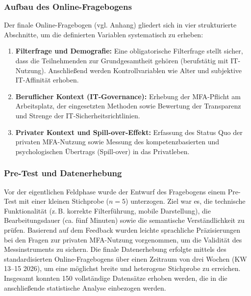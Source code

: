 \subsubsection{Aufbau des Online-Fragebogens}
Der finale Online-Fragebogen (vgl. Anhang) gliedert sich in vier strukturierte Abschnitte, um die definierten Variablen systematisch zu erheben:
\begin{enumerate}
    \item \textbf{Filterfrage und Demografie:} Eine obligatorische Filterfrage stellt sicher, dass die Teilnehmenden zur Grundgesamtheit gehören (berufstätig mit IT-Nutzung). Anschließend werden Kontrollvariablen wie Alter und subjektive IT-Affinität erhoben.
    \item \textbf{Beruflicher Kontext (IT-Governance):} Erhebung der MFA-Pflicht am Arbeitsplatz, der eingesetzten Methoden sowie Bewertung der Transparenz und Strenge der IT-Sicherheitsrichtlinien.
    \item \textbf{Privater Kontext und Spill-over-Effekt:} Erfassung des Status Quo der privaten MFA-Nutzung sowie Messung des kompetenzbasierten und psychologischen Übertrags (Spill-over) in das Privatleben.
\end{enumerate}

\subsubsection{Pre-Test und Datenerhebung}
Vor der eigentlichen Feldphase wurde der Entwurf des Fragebogens einem Pre-Test mit einer kleinen Stichprobe ($n = 5$) unterzogen. Ziel war es, die technische Funktionalität (z.\,B. korrekte Filterführung, mobile Darstellung), die Bearbeitungsdauer (ca. fünf Minuten) sowie die semantische Verständlichkeit zu prüfen. Basierend auf dem Feedback wurden leichte sprachliche Präzisierungen bei den Fragen zur privaten MFA-Nutzung vorgenommen, um die Validität des Messinstruments zu sichern.
Die finale Datenerhebung erfolgte mittels des standardisierten Online-Fragebogens über einen Zeitraum von drei Wochen (KW 13--15 2026), um eine möglichst breite und heterogene Stichprobe zu erreichen. Insgesamt konnten 150 vollständige Datensätze erhoben werden, die in die anschließende statistische Analyse einbezogen werden.

